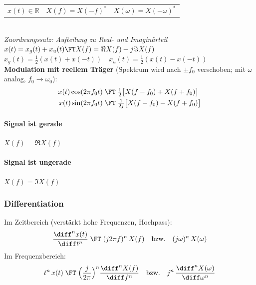 \begin{sectionbox}
\begin{tabularx}{\linewidth}{lll}
        $x(t) \in \mathbb R$   & $X(f) = X(-f)^*$                      & $X(\omega) = X(-\omega)^*$                 \\
    \end{tabularx} \\
    {\color{black!60}\textit{Zuordnungssatz: Aufteilung zu Real- und Imaginärteil}} \\
    $x(t) = x_g(t) + x_u(t) \FT X(f) = \Re{X(f)} + j\Im{X(f)}$                            \\
    $x_g(t) = \frac{1}{2}(x(t) + x(-t))\quad x_u(t) = \frac{1}{2}(x(t) - x(-t))$ \\
    \textbf{Modulation mit reellem Träger} (Spektrum wird nach $\pm f_0$ verschoben; mit $\omega$ analog, $f_0\to\omega_0$):
    \begin{align*}
        x(t)\cos(2\pi f_0t) & \;\FT\;\tfrac{1}{2}\big[X(f-f_0)+X(f+f_0)\big]  \\
        x(t)\sin(2\pi f_0t) & \;\FT\;\tfrac{1}{2j}\big[X(f-f_0)-X(f+f_0)\big]
    \end{align*}

    \paragraph{Signal ist gerade} $X(f) = \Re{X(f)}$
    \paragraph{Signal ist ungerade} $X(f) = \Im{X(f)}$
\end{sectionbox}

\begin{sectionbox}
    \subsubsection{Differentiation}
    Im Zeitbereich (verstärkt hohe Frequenzen, Hochpass):
    \begin{equation*}
        \frac{\diff^n x(t)}{\diff t^n}\;\FT\;(j2\pi f)^n\,X(f)\quad\text{bzw.}\quad(j\omega)^n\,X(\omega)
    \end{equation*}
    Im Frequenzbereich:
    \begin{equation*}
        t^n\,x(t)\;\FT\;\Big(\frac{j}{2\pi}\Big)^n\frac{\diff^n X(f)}{\diff f^n}\quad\text{bzw.}\quad j^n\,\frac{\diff^n X(\omega)}{\diff\omega^n}
    \end{equation*}
\end{sectionbox}

